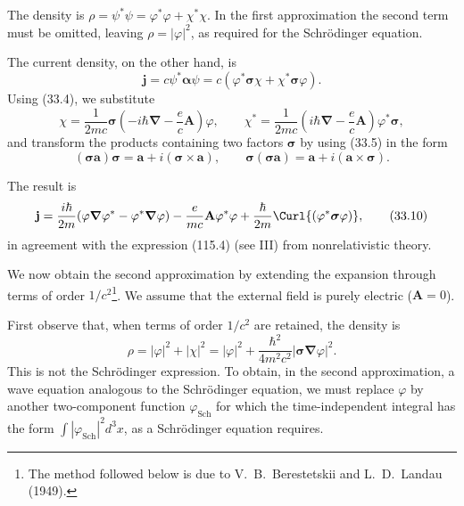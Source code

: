 The density is $\rho=\psi^*\psi=\varphi^*\varphi+\chi^*\chi$. In the first approximation the second term must be omitted, leaving $\rho=|\varphi|^2$, as required for the Schrödinger equation.

The current density, on the other hand, is
\[
\mathbf j=c\psi^*\boldsymbol{\alpha}\psi
=c(\varphi^*\boldsymbol{\sigma}\chi+\chi^*\boldsymbol{\sigma}\varphi).
\]
Using (33.4), we substitute
\[
\chi=\frac1{2mc}\boldsymbol{\sigma}
\left(-i\hbar\boldsymbol\nabla-\frac ec\mathbf A\right)\varphi,
\qquad
\chi^*=\frac1{2mc}\left(i\hbar\boldsymbol\nabla-\frac ec\mathbf A\right)\varphi^*\boldsymbol{\sigma},
\]
and transform the products containing two factors $\boldsymbol{\sigma}$ by using (33.5) in the form
\begin{equation}
(\boldsymbol{\sigma}\mathbf a)\boldsymbol{\sigma}
=\mathbf a+i(\boldsymbol{\sigma}\times\mathbf a),
\qquad
\boldsymbol{\sigma}(\boldsymbol{\sigma}\mathbf a)
=\mathbf a+i(\mathbf a\times\boldsymbol{\sigma}).
\tag{33.9}
\end{equation}

The result is
\begin{equation}
\mathbf j=\frac{i\hbar}{2m}(\varphi\boldsymbol\nabla\varphi^*-\varphi^*\boldsymbol\nabla\varphi)
-\frac e{mc}\mathbf A\varphi^*\varphi
+\frac\hbar{2m}\Curl{(\varphi^*\boldsymbol{\sigma}\varphi)},
\tag{33.10}
\end{equation}
in agreement with the expression (115.4) (see III) from nonrelativistic theory.

We now obtain the second approximation by extending the expansion through terms of order $1/c^2$\footnote{The method followed below is due to V.~B.~Berestetskii and L.~D.~Landau (1949).}. We assume that the external field is purely electric ($\mathbf A=0$).

First observe that, when terms of order $1/c^2$ are retained, the density is
\[
\rho=|\varphi|^2+|\chi|^2
=|\varphi|^2+\frac{\hbar^2}{4m^2c^2}|\boldsymbol{\sigma}\boldsymbol\nabla\varphi|^2.
\]
This is not the Schrödinger expression. To obtain, in the second approximation, a wave equation analogous to the Schrödinger equation, we must replace $\varphi$ by another two-component function $\varphi_{\mathrm{Sch}}$ for which the time-independent integral has the form $\int|\varphi_{\mathrm{Sch}}|^2d^3x$, as a Schrödinger equation requires.

